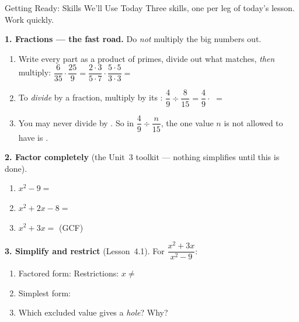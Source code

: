 \documentclass[10pt]{article}
\begin{document}
\namedateperiod

\vspace{0.10in}

\begin{notesbox}{Getting Ready: Skills We'll Use Today}
\small Three skills, one per leg of today's lesson. Work quickly.

\vspace{4pt}
\textbf{1. Fractions --- the fast road.} Do \emph{not} multiply the big numbers out.
\begin{enumerate}[label=(\alph*), leftmargin=2.1em, itemsep=3pt]
  \item Write every part as a product of primes, divide out what matches, \emph{then} multiply:
        $\dfrac{6}{35}\cdot\dfrac{25}{9}=\dfrac{2\cdot3}{5\cdot7}\cdot\dfrac{5\cdot5}{3\cdot3}=$
  \item To \emph{divide} by a fraction, multiply by its :
        $\dfrac{4}{9}\div\dfrac{8}{15}=\dfrac{4}{9}\cdot$  $=$ 
  \item You may never divide by . So in $\dfrac{4}{9}\div\dfrac{n}{15}$, the one value
        $n$ is not allowed to have is .
\end{enumerate}

\vspace{4pt}
\textbf{2. Factor completely} (the Unit~3 toolkit --- nothing simplifies until this is done).
\begin{enumerate}[label=(\alph*), leftmargin=2.1em, itemsep=3pt]
  \item $x^2-9=$ 
  \item $x^2+2x-8=$ 
  \item $x^2+3x=$  \quad (GCF)
\end{enumerate}

\vspace{4pt}
\textbf{3. Simplify and restrict} (Lesson~4.1). For $\dfrac{x^2+3x}{x^2-9}$:
\begin{enumerate}[label=(\alph*), leftmargin=2.1em, itemsep=3pt]
  \item Factored form:  \quad Restrictions: $x\neq$ 
  \item Simplest form: 
  \item Which excluded value gives a \emph{hole}?  \; Why? 
\end{enumerate}

\end{notesbox}
\end{document}
